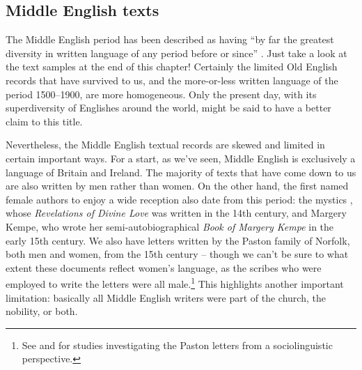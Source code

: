 \subsection{Middle English texts}\label{ME-text-transmission}

The Middle English period has been described as having ``by far the greatest diversity in written language of any period before or since'' \citep[156]{Milroy1992}. Just take a look at the text samples at the end of this chapter! Certainly the limited Old English records that have survived to us, and the more-or-less  written language of the period 1500--1900, are more homogeneous. Only the present day, with its superdiversity of Englishes around the world, might be said to have a better claim to this title.

Nevertheless, the Middle English textual records are skewed and limited in certain important ways. For a start, as we've seen, Middle English is exclusively a language of Britain and Ireland. The majority of texts that have come down to us are also written by men rather than women. On the other hand, the first named female authors to enjoy a wide reception also date from this period: the mystics , whose \emph{Revelations of Divine Love} was written in the 14th century, and Margery Kempe, who wrote her semi-autobiographical \emph{Book of Margery Kempe} in the early 15th century. We also have letters written by the Paston family of Norfolk, both men and women, from the 15th century -- though we can't be sure to what extent these documents reflect women's language, as the scribes who were employed to write the letters were all male.\footnote{See \citet{HernandezCampoyCondeSilvestre2004} and \citet{Bergs2011} for studies investigating the Paston letters from a sociolinguistic perspective.} This highlights another important limitation: basically all Middle English writers were part of the church, the nobility, or both.

